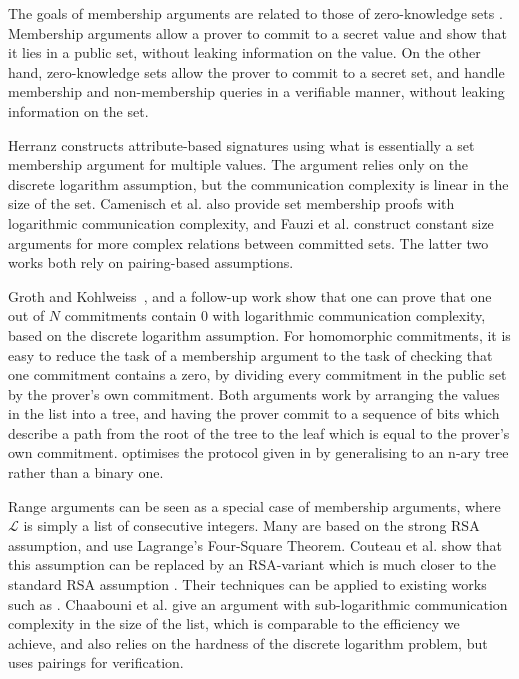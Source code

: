 The goals of membership arguments are related to those of zero-knowledge sets \cite{Micali}. Membership arguments allow a prover to commit to a secret value and show that it lies in a public set, without leaking information on the value. On the other hand, zero-knowledge sets allow the prover to commit to a secret set, and handle membership and non-membership queries in a verifiable manner, without leaking information on the set.

Herranz constructs attribute-based signatures \cite{Herranz} using what is essentially a set membership argument for multiple values. The argument relies only on the discrete logarithm assumption, but the communication complexity is linear in the size of the set. Camenisch et al. \cite{Camenisch2008} also provide set membership proofs with logarithmic communication complexity, and Fauzi et al. \cite{Fauzi2014} construct constant size arguments for more complex relations between committed sets. The latter two works both rely on pairing-based assumptions.

Groth and Kohlweiss~\cite{GrothK15}, and a follow-up work \cite{BootleCCGGP15} show that one can prove that one out of $N$ commitments contain $0$ with logarithmic communication complexity, based on the discrete logarithm assumption. For homomorphic commitments, it is easy to reduce the task of a membership argument to the task of checking that one commitment contains a zero, by dividing every commitment in the public set by the prover's own commitment. Both arguments work by arranging the values in the list into a tree, and having the prover commit to a sequence of bits which describe a path from the root of the tree to the leaf which is equal to the prover's own commitment. \cite{BootleCCGGP15} optimises the protocol given in \cite{GrothK15} by generalising to an n-ary tree rather than a binary one.

Range arguments can be seen as a special case of membership arguments, where $\mathcal{L}$ is simply a list of consecutive integers. Many are based on the strong RSA assumption, and use Lagrange's Four-Square Theorem. Couteau et al. show that this assumption can be replaced by an RSA-variant which is much closer to the standard RSA assumption \cite{CouteauPP17}. Their techniques can be applied to existing works such as \cite{Groth05,Lip03}. Chaabouni et al.  \cite{Chaabouni2010} give an argument with sub-logarithmic communication complexity in the size of the list, which is comparable to the efficiency we achieve, and also relies on the hardness of the discrete logarithm problem, but uses pairings for verification.

